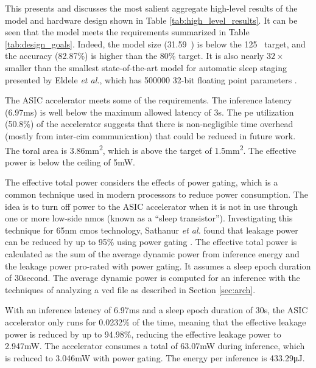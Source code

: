 This presents and discusses the most salient aggregate high-level results of the model and hardware design shown in Table \ref{tab:high_level_results}.
It can be seen that the model meets the requirements summarized in Table \ref{tab:design_goals}. Indeed, the model size (31.59\si{\kilo\byte}) is below the
125\si{\kilo\byte} target, and the accuracy (82.87\%) is higher than the 80\% target. It is also nearly $32\times$ smaller than the smallest state-of-the-art
model for automatic sleep staging presented by Eldele \textit{et al.}, which has 500000 32-bit floating point parameters \cite{eldele2021attention}.

The ASIC accelerator meets some of the requirements. The inference latency (6.97\si{\milli\second}) is well below the maximum allowed latency of 3\si{\second}.
The \ac{pe} utilization (50.8\%) of the accelerator suggests that there is non-negligible time overhead (mostly from inter-\ac{cim} communication) that could be
reduced in future work. The toral area is 3.86\si{\square\milli\meter}, which is above the target of 1.5\si{\square\milli\meter}. The effective power is below the
ceiling of 5\si{\milli\watt}.

The effective total power considers the effects of power gating, which is a common technique used in modern processors to reduce power consumption. The idea
is to turn off power to the ASIC accelerator when it is not in use through one or more low-side \ac{nmos} (known as a ``sleep transistor''). Investigating this
technique for 65nm \ac{cmos} technology, Sathanur \textit{et al.} found that leakage power can be reduced by up to 95\% using power gating \cite{sathanur2008quantifying}.
The effective total power is calculated as the sum of the average dynamic power from inference energy and the leakage power pro-rated with power gating. It assumes a
sleep epoch duration of 30\si{second}. The average dynamic power is computed for an inference with the techniques of analyzing a \ac{vcd} file as described in 
Section \ref{sec:arch}.

With an inference latency of 6.97\si{\milli\second} and a sleep epoch duration of 30\si{\second}, the ASIC accelerator only runs for 0.0232\% of the time, meaning
that the effective leakage power is reduced by up to 94.98\%, reducing the effective leakage power to 2.947\si{\milli\watt}. The accelerator consumes a total of
63.07\si{\milli\watt} during inference, which is reduced to 3.046\si{\milli\watt} with power gating. The energy per inference is 433.29\si{\micro\joule}. 

